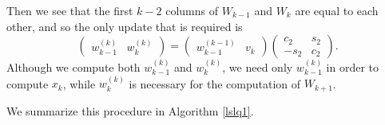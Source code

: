 \documentclass[11pt]{article}
\begin{document}
Then we see that the first $k-2$ columns of $W_{k-1}$ and $W_k$ are equal to each other, and so the only update that is required is
\begin{equation}
\begin{pmatrix} w^{(k)}_{k-1} & w^{(k)}_k \end{pmatrix} = 
\begin{pmatrix} w^{(k-1)}_{k-1} & v_k \end{pmatrix}
\begin{pmatrix}  c_2 & s_2 \\ -s_2 & c_2 \end{pmatrix}.
\end{equation}
Although we compute both $w^{(k)}_{k-1}$ and $w^{(k)}_k$, we need only $w^{(k)}_{k-1}$ in order to compute $x_k$, while $w^{(k)}_k$ is necessary for the computation of $W_{k+1}$.

We summarize this procedure in Algorithm \ref{lslq1}.
\end{document}
